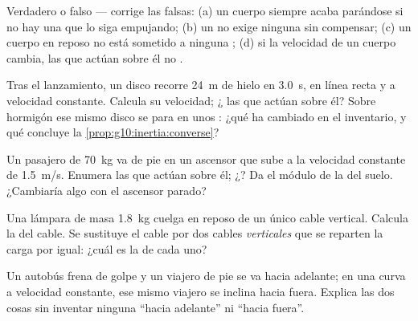 \begin{exercise}[$\star$]\label{exo:g10:inertia:5}
Verdadero o falso --- corrige las falsas: (a) un cuerpo siempre acaba
parándose si no hay una  que lo siga empujando; (b) un  no exige ninguna  sin compensar; (c) un cuerpo
en reposo no está sometido a ninguna ; (d) si la velocidad de un
cuerpo cambia, las  que actúan sobre él no .
\end{exercise}

\begin{exercise}[$\star\star$]\label{exo:g10:inertia:6}
Tras el lanzamiento, un disco recorre \qty{24}{m} de hielo en
\qty{3.0}{s}, en línea recta y a velocidad constante. Calcula su
velocidad; ¿ las  que actúan sobre él? Sobre hormigón
ese mismo disco se para en unos : ¿qué ha cambiado en el
inventario, y qué concluye la
\cref{prop:g10:inertia:converse}?
\end{exercise}

\begin{exercise}[$\star\star$]\label{exo:g10:inertia:7}
Un pasajero de \qty{70}{kg} va de pie en un ascensor que sube a la
velocidad constante de \qty{1.5}{m/s}. Enumera las  que actúan
sobre él; ¿? Da el módulo de la  del suelo. ¿Cambiaría
algo con el ascensor parado?
\end{exercise}

\begin{exercise}[$\star\star$]\label{exo:g10:inertia:8}
Una lámpara de masa \qty{1.8}{kg} cuelga en reposo de un único cable
vertical. Calcula la  del cable. Se sustituye el cable por dos
cables \emph{verticales} que se reparten la carga por igual: ¿cuál es la
 de cada uno?
\end{exercise}

\begin{exercise}[$\star\star$]\label{exo:g10:inertia:9}
Un autobús frena de golpe y un viajero de pie se va hacia adelante; en
una curva a velocidad constante, ese mismo viajero se inclina hacia
fuera. Explica las dos cosas sin inventar ninguna  ``hacia
adelante'' ni ``hacia fuera''.
\end{exercise}

